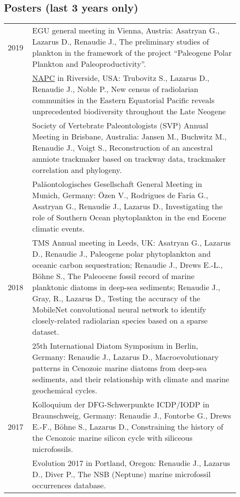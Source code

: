 \documentclass[11pt, a4paper]{article}
\begin{document}
\subsection[Posters]{Posters \textnormal{\footnotesize{(last 3 years only)}}}
\begin{longtable}{p{0.1\linewidth} P{0.85\linewidth}}
2019 & EGU general meeting in Vienna, Austria: Asatryan G., Lazarus D., Renaudie J., The preliminary studies of plankton in the framework of the project ``Paleogene Polar Plankton and Paleoproductivity''.\\
& \href{https://escholarship.org/uc/item/6r18f8wn}{NAPC} in Riverside, USA: Trubovitz S., Lazarus D., Renaudie J., Noble P., New census of radiolarian communities in the Eastern Equatorial Pacific reveals unprecedented biodiversity throughout the Late Neogene\\
 & Society of Vertebrate Paleontologists (SVP) Annual Meeting in Brisbane, Australia: Jansen M., Buchwitz M., Renaudie J., Voigt S., Reconstruction of an ancestral amniote trackmaker based on trackway data, trackmaker correlation and phylogeny.\\
 & Paläontologisches Gesellschaft General Meeting in Munich, Germany: Özen V., Rodrigues de Faria G., Asatryan G., Renaudie J., Lazarus D., Investigating the role of Southern Ocean phytoplankton in the end Eocene climatic events.\\
2018 & TMS Annual meeting in Leeds, UK: Asatryan G., Lazarus D., Renaudie J., Paleogene polar phytoplankton and oceanic carbon sequestration; Renaudie J., Drews E.-L., Böhne S., The Paleocene fossil record of marine planktonic diatoms in deep-sea sediments; Renaudie J., Gray, R., Lazarus D., Testing the accuracy of the MobileNet convolutional neural network to identify closely-related radiolarian species based on a sparse dataset.\\
& 25th International Diatom Symposium in Berlin, Germany: Renaudie J., Lazarus D., Macroevolutionary patterns in Cenozoic marine diatoms from deep-sea sediments, and their relationship with climate and marine geochemical cycles.\\
2017 & Kolloquium der DFG-Schwerpunkte ICDP/IODP in Braunschweig, Germany: Renaudie J., Fontorbe G., Drews E.-F., Böhne S., Lazarus D., Constraining the history of the Cenozoic marine silicon cycle with siliceous microfossils.\\
 & Evolution 2017 in Portland, Oregon: Renaudie J., Lazarus D., Diver P., The NSB (Neptune) marine microfossil occurrences database.\\

\end{longtable}
\end{document}
